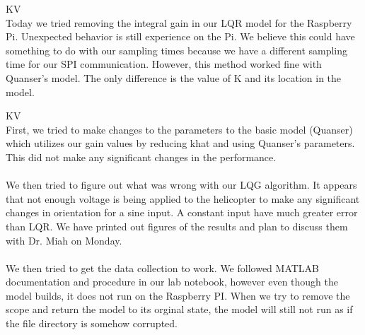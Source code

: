 \documentclass[fontsize=11pt, %
                             paper=letter, %
                             openany, %
                             captions=tableheading,
                             index=totoc,
                             hyperref]{labbook}
\begin{document}
\begin{addmargin}[0cm]{0cm}
KV\\
Today we tried removing the integral gain in our LQR model for the Raspberry Pi.  Unexpected behavior is still experience on the Pi.  We believe this could have something to do with our sampling times because we have a different sampling time for our SPI communication.  However, this method worked fine with Quanser's model.  The only difference is the value of K and its location in the model. 

KV\\
First, we tried to make changes to the parameters to the basic model (Quanser) which utilizes our gain values by reducing khat and using Quanser's parameters. This did not make any significant changes in the performance.\\
\\
We then tried to figure out what was wrong with our LQG algorithm.  It appears that not enough voltage is being applied to the helicopter to make any significant changes in orientation for a sine input.  A constant input have much greater error than LQR.  We have printed out figures of the results and plan to discuss them with Dr. Miah on Monday.\\
\\
We then tried to get the data collection to work.  We followed MATLAB documentation and procedure in our lab notebook, however even though the model builds, it does not run on the Raspberry PI.  When we try to remove the scope and return the model to its orginal state, the model will still not run as if the file directory is somehow corrupted.



\end{addmargin}
\end{document}
